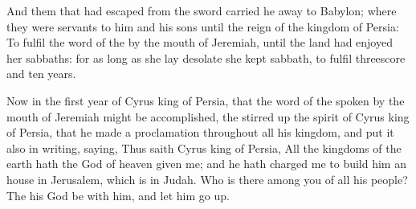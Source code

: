 \verse And them that had escaped from the sword carried he away to Babylon; where they were servants to him and his sons until the reign of the kingdom of Persia: \verse To fulfil the word of the \LORD by the mouth of Jeremiah, until the land had enjoyed her sabbaths: for as long as she lay desolate she kept sabbath, to fulfil threescore and ten years.

\verse Now in the first year of Cyrus king of Persia, that the word of the \LORD spoken by the mouth of Jeremiah might be accomplished, the \LORD stirred up the spirit of Cyrus king of Persia, that he made a proclamation throughout all his kingdom, and put it also in writing, saying, \verse Thus saith Cyrus king of Persia, All the kingdoms of the earth hath the \LORD God of heaven given me; and he hath charged me to build him an house in Jerusalem, which is in Judah. Who is there among you of all his people?  The \LORD his God be with him, and let him go up.

